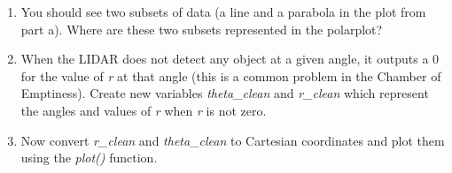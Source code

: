 \documentclass[M3_Night5_Solutions]{subfiles}
\begin{document}
\begin{enumerate}[resume=exercises, label=\textbf{Exercise} (\arabic*)]
\item You should see two subsets of data (a line and a parabola in the plot from part a). Where are these two subsets represented in the polarplot?

\item When the LIDAR does not detect any object at a given angle, it outputs a 0 for the value of \textit{r} at that angle (this is a common problem in the Chamber of Emptiness). Create new variables \textit{theta\_clean} and \textit{r\_clean} which represent the angles and values of \textit{r} when \textit{r} is not zero.

\item Now convert \textit{r\_clean} and \textit{theta\_clean} to Cartesian coordinates and plot them using the \textit{plot()} function.



\end{enumerate}
\end{document}
